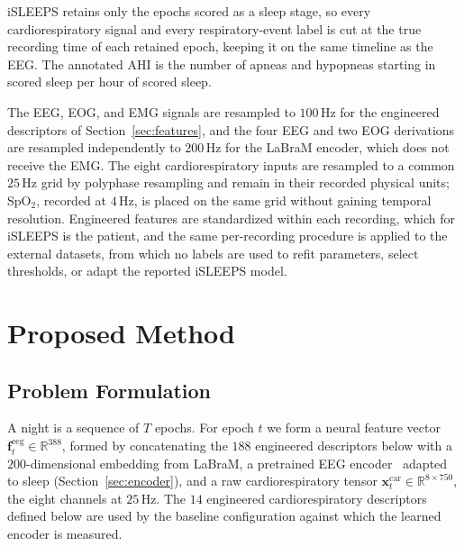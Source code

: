 \documentclass[a4paper,fleqn]{cas-sc}
\begin{document}
iSLEEPS retains only the epochs scored as a sleep stage, so every cardiorespiratory
signal and every respiratory-event label is cut at the true recording time of each
retained epoch, keeping it on the same timeline as the EEG. The annotated AHI is the
number of apneas and hypopneas starting in scored sleep per hour of scored sleep.

The EEG, EOG, and EMG signals are resampled to $100$\,Hz for the engineered
descriptors of Section~\ref{sec:features}, and the four EEG and two EOG derivations
are resampled independently to $200$\,Hz for the LaBraM encoder, which does not
receive the EMG. The eight cardiorespiratory inputs are resampled to a common
$25$\,Hz grid by polyphase resampling and remain in their recorded physical units;
SpO$_2$, recorded at $4$\,Hz, is placed on the same grid without gaining temporal
resolution. Engineered features are standardized within each recording, which for
iSLEEPS is the patient, and the same per-recording procedure is applied to the
external datasets, from which no labels are used to refit parameters, select
thresholds, or adapt the reported iSLEEPS model.

\section{Proposed Method}
\label{sec:method}
\subsection{Problem Formulation}
A night is a sequence of $T$ epochs. For epoch $t$ we form a neural feature vector
$\mathbf{f}^{\mathrm{eeg}}_t\in\mathbb{R}^{388}$, formed by concatenating the $188$
engineered descriptors below with a $200$-dimensional embedding from LaBraM, a
pretrained EEG encoder~\cite{labram2024} adapted to sleep (Section~\ref{sec:encoder}), and a raw cardiorespiratory tensor
$\mathbf{x}^{\mathrm{car}}_t\in\mathbb{R}^{8\times750}$, the eight channels at $25$\,Hz.
The $14$ engineered cardiorespiratory descriptors defined below are used by the baseline
configuration against which the learned encoder is measured.
\end{document}

